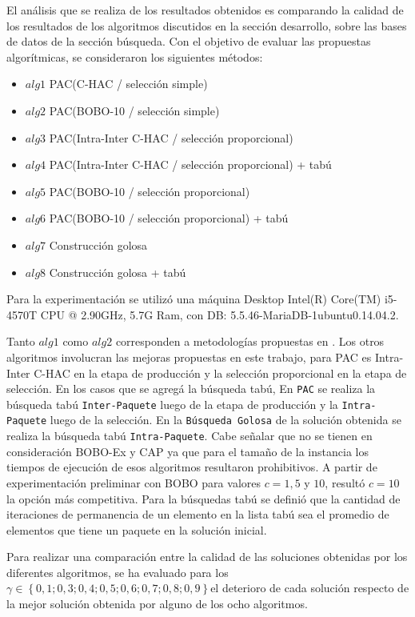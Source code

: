 El análisis que se realiza de los resultados obtenidos es comparando la calidad de los resultados de los algoritmos discutidos en la sección desarrollo, sobre las bases de datos de la sección búsqueda. Con el objetivo de evaluar las propuestas algorítmicas, se consideraron los siguientes métodos:

\begin{itemize}
\item{$alg1$} PAC(C-HAC / selección simple)
\item{$alg2$} PAC(BOBO-10 / selección simple)
\item{$alg3$} PAC(Intra-Inter C-HAC / selección proporcional)
\item{$alg4$} PAC(Intra-Inter C-HAC / selección proporcional) + tabú
\item{$alg5$} PAC(BOBO-10 / selección proporcional)
\item{$alg6$} PAC(BOBO-10 / selección proporcional) + tabú
\item{$alg7$} Construcción golosa
\item{$alg8$} Construcción golosa + tabú
\end{itemize}

Para la experimentación se utilizó una máquina Desktop Intel(R) Core(TM) i5-4570T CPU @ 2.90GHz, 5.7G Ram, con DB: 5.5.46-MariaDB-1ubuntu0.14.04.2.

Tanto $alg1$ como $alg2$ corresponden a metodologías propuestas en \cite{compositeRetrival}. Los otros algoritmos involucran las mejoras propuestas en este trabajo, para PAC es Intra-Inter C-HAC en la etapa de producción y la selección proporcional en la etapa de selección. En los casos que se agregá la búsqueda tabú, En \texttt{PAC} se realiza la búsqueda tabú \texttt{Inter-Paquete} luego de la etapa de producción y la \texttt{Intra-Paquete} luego de la selección. En la \texttt{Búsqueda Golosa} de la solución obtenida se realiza la búsqueda tabú \texttt{Intra-Paquete}. Cabe señalar que no se tienen en consideración BOBO-Ex y CAP ya que para el tamaño de la instancia los tiempos de ejecución de esos algoritmos resultaron prohibitivos. A partir de experimentación preliminar con BOBO para valores $c=1, 5$ y $10$, resultó $c=10$ la opción más competitiva.  Para la búsquedas tabú se definió que la cantidad de iteraciones de permanencia de un elemento en la lista tabú sea el promedio de elementos que tiene un paquete en la solución inicial.

Para realizar una comparación entre la calidad de las soluciones obtenidas por los diferentes algoritmos, se ha evaluado para los $\gamma \in \left\{0,1; 0,3; 0,4; 0,5; 0,6; 0,7; 0,8; 0,9\right\} $el deterioro de cada solución respecto de la mejor solución obtenida por alguno de los ocho algoritmos.

